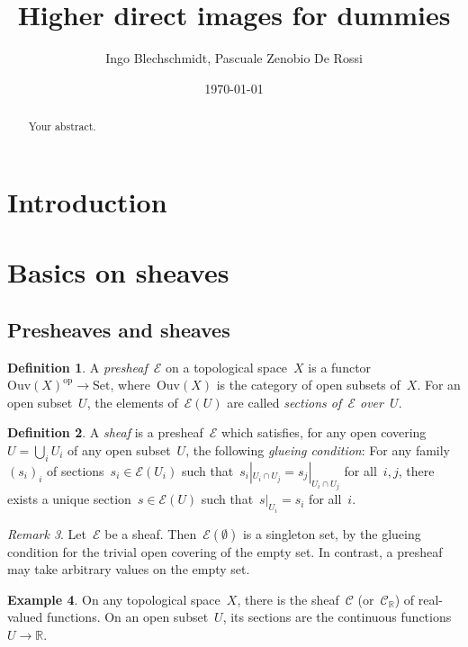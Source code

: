 \documentclass[10pt]{amsart}
\title{Higher direct images for dummies}
\author{Ingo Blechschmidt, Pascuale Zenobio De Rossi}
\date{\today}
\theoremstyle{definition}
\newtheorem{defn}{Definition}[section]
\newtheorem{ex}[defn]{Example}
\theoremstyle{plain}
\theoremstyle{remark}
\newtheorem{rem}[defn]{Remark}
\newcommand{\C}{\mathcal{C}}
\newcommand{\E}{\mathcal{E}}
\newcommand{\RR}{\mathbb{R}}
\newcommand{\Set}{\mathrm{Set}}
\newcommand{\Ouv}{\mathrm{Ouv}}
\newcommand{\op}{\mathrm{op}}
\begin{document}
\begin{abstract}
Your abstract.
\end{abstract}

\maketitle

\setcounter{tocdepth}{1}
\tableofcontents

\section{Introduction}

\section{Basics on sheaves}

\subsection{Presheaves and sheaves}

\begin{defn}A \emph{presheaf}~$\E$ on a topological space~$X$ is a
functor~$\Ouv(X)^\op \to \Set$, where~$\Ouv(X)$ is the category of open subsets
of~$X$. For an open subset~$U$, the elements of~$\E(U)$ are called
\emph{sections of~$\E$ over~$U$}.\end{defn}

\begin{defn}A \emph{sheaf} is a presheaf~$\E$ which satisfies, for any open covering~$U
= \bigcup_i U_i$ of any open subset~$U$, the following \emph{glueing
condition}: For any family~$(s_i)_i$ of sections~$s_i \in \E(U_i)$ such
that~$s_i|_{U_i \cap U_j} = s_j|_{U_i \cap U_j}$ for all~$i,j$, there exists a
unique section~$s \in \E(U)$ such that~$s|_{U_i} = s_i$ for all~$i$.
\end{defn}

\begin{rem}Let~$\E$ be a sheaf. Then~$\E(\emptyset)$ is a singleton set, by the
glueing condition for the trivial open covering of the empty set. In contrast,
a presheaf may take arbitrary values on the empty set.\end{rem}

\begin{ex}On any topological space~$X$, there is the sheaf~$\C$ (or~$\C_\RR$) of
real-valued functions. On an open subset~$U$, its sections are the continuous
functions~$U \to \RR$.
\end{ex}
\end{document}
